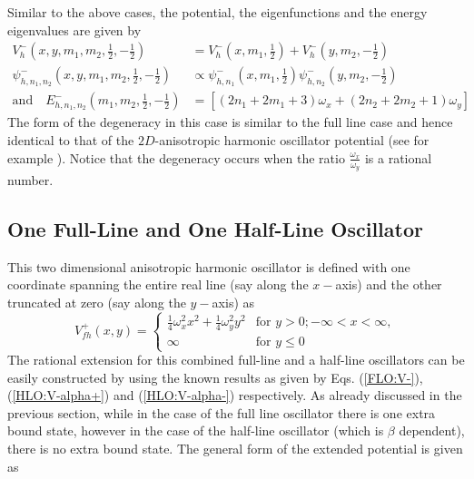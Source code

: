 \documentclass[12pt]{article}
\numberwithin{equation}{section} %
\begin{document}
Similar to the above cases, the potential, the eigenfunctions and the energy 
eigenvalues are given by 
\begin{align}
    V_h^-(x,y,m_1,m_2,\frac{1}{2},-\frac{1}{2}) &= V_h^-(x,m_1,\frac{1}{2}) + V_h^-(y,m_2,-\frac{1}{2}) \\
    \psi_{h,n_1,n_2}^-(x,y,m_1,m_2,\frac{1}{2},-\frac{1}{2})&\propto\psi^-_{h,n_1}(x,m_1,\frac{1}{2})\psi^-_{h,n_2}(y,m_2,-\frac{1}{2})\\
    \mbox{and} \quad	
E_{h,n_1,n_2}^-(m_1,m_2,\frac{1}{2},-\frac{1}{2})&=\left[\left(2n_1+2m_1+3\right)\omega_x +\left(2n_2+2m_2+1\right)\omega_y\right]\,
\end{align}
The form of the degeneracy in this case is similar to the full line case and
hence identical to that of the $2D$-anisotropic harmonic oscillator potential 
(see for example \cite{louck1973canonical}). Notice that the degeneracy occurs 
when the ratio $\frac{\omega_x}{\omega_y}$ is a rational number.

\subsection{One Full-Line and One Half-Line Oscillator}

This two dimensional anisotropic harmonic oscillator is defined with one 
coordinate spanning the entire real line 
(say along the $x-$axis) and the other truncated at zero (say along the 
$y-$axis) as
\[ V^+_{fh}(x,y) = 
\begin{cases} 
\frac{1}{4}\omega_x^2 x^2 + \frac{1}{4}\omega_y^2 y^2 & \text{for } y > 0; -\infty<x<\infty, \\
\infty & \text{for } y \le 0
\end{cases}
\]
The rational extension for this combined full-line and a half-line oscillators  can be easily constructed by using the known results as given by Eqs. 
(\ref{FLO:V-}), (\ref{HLO:V-alpha+}) and (\ref{HLO:V-alpha-}) respectively. 
As already discussed in the previous section, while in the case of the full 
line oscillator there is one extra bound state, however in the case of the 
half-line oscillator (which is $\beta$ dependent), there is no extra bound 
state. The general form of the extended potential is given as 
\end{document}
